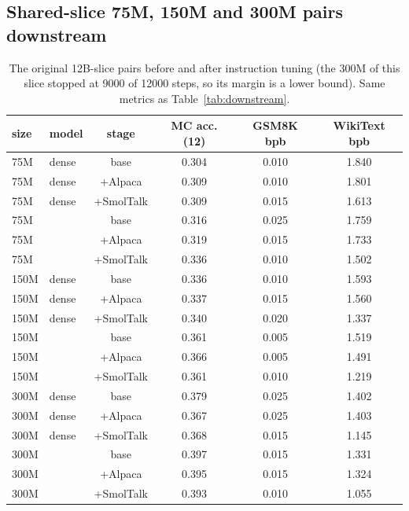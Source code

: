 \subsection{Shared-slice 75M, 150M and 300M pairs downstream}
\label{app:shared_down}
\begin{table}[h]\centering\footnotesize\setlength{\tabcolsep}{2.5pt}
\begin{tabular}{llcccc}\toprule
size & model & stage & MC acc. (12) & GSM8K bpb & WikiText bpb \\\midrule
75M & dense & base & 0.304 & 0.010 & 1.840 \\
75M & dense & +Alpaca & 0.309 & 0.010 & 1.801 \\
75M & dense & +SmolTalk & 0.309 & 0.015 & 1.613 \\
75M & \dagf{} & base & 0.316 & 0.025 & 1.759 \\
75M & \dagf{} & +Alpaca & 0.319 & 0.015 & 1.733 \\
75M & \dagf{} & +SmolTalk & 0.336 & 0.010 & 1.502 \\
150M & dense & base & 0.336 & 0.010 & 1.593 \\
150M & dense & +Alpaca & 0.337 & 0.015 & 1.560 \\
150M & dense & +SmolTalk & 0.340 & 0.020 & 1.337 \\
150M & \dagf{} & base & 0.361 & 0.005 & 1.519 \\
150M & \dagf{} & +Alpaca & 0.366 & 0.005 & 1.491 \\
150M & \dagf{} & +SmolTalk & 0.361 & 0.010 & 1.219 \\
300M & dense & base & 0.379 & 0.025 & 1.402 \\
300M & dense & +Alpaca & 0.367 & 0.025 & 1.403 \\
300M & dense & +SmolTalk & 0.368 & 0.015 & 1.145 \\
300M & \dagf{} & base & 0.397 & 0.015 & 1.331 \\
300M & \dagf{} & +Alpaca & 0.395 & 0.015 & 1.324 \\
300M & \dagf{} & +SmolTalk & 0.393 & 0.010 & 1.055 \\
\bottomrule\end{tabular}
\caption{The original 12B-slice pairs before and after instruction tuning (the 300M \dagf{} of this slice stopped at 9000 of 12000 steps, so its margin is a lower bound). Same metrics as Table~\ref{tab:downstream}.}
\label{tab:shared_down}\end{table}

